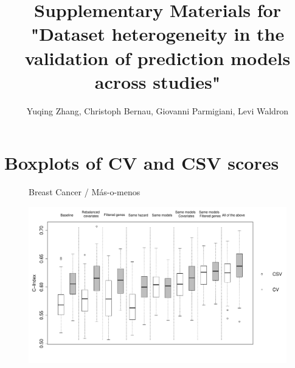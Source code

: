 \documentclass{article}
\title{Supplementary Materials for "Dataset heterogeneity in the validation of prediction models across studies"}
\author{Yuqing Zhang, Christoph Bernau, Giovanni Parmigiani, Levi Waldron}
\date{}
\begin{document}
\maketitle
\tableofcontents
\newpage

%


\section{Boxplots of CV and CSV scores}


\begin{figure}[H]
		\centering            
        	\centerline{Breast Cancer / M\'{a}s-o-menos}
            \includegraphics[width=16cm]{boxplot_breast_masomenos_allpanels_new.pdf}
   \end{figure}
   
\end{document}
